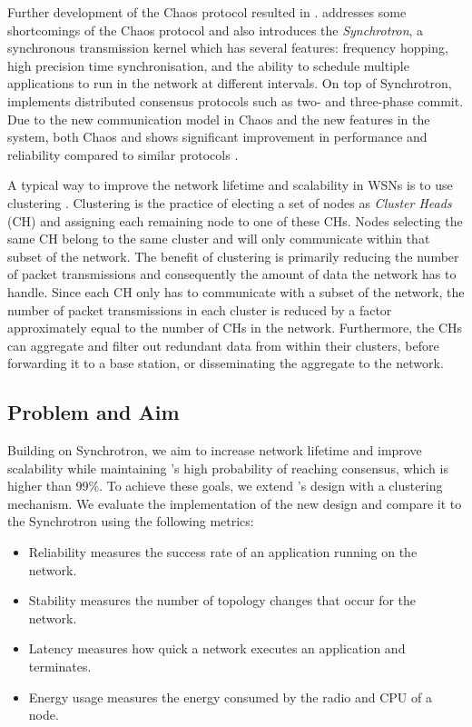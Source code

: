 Further development of the Chaos protocol resulted in \atwo{} \cite{a2-introduction-paper}. \atwo{} addresses some shortcomings of the Chaos protocol and also introduces the \atwo{} \textit{Synchrotron}, a synchronous transmission kernel which has several features: frequency hopping, high precision time synchronisation, and the ability to schedule multiple applications to run in the network at different intervals. On top of Synchrotron, \atwo{} implements distributed consensus protocols such as two- and three-phase commit. Due to the new communication model in Chaos and the new features in the \atwo{} system, both Chaos and \atwo{} shows significant improvement in performance and reliability compared to similar protocols \cite{chaos-introduction-paper, a2-introduction-paper}.

A typical way to improve the network lifetime and scalability in WSNs is to use clustering \cite{Afsar2014-clustering-survey, Younis2006-clustering-survey}. Clustering is the practice of electing a set of nodes as \emph{Cluster Heads} (CH) and assigning each remaining node to one of these CHs. Nodes selecting the same CH belong to the same cluster and will only communicate within that subset of the network. The benefit of clustering is primarily reducing the number of packet transmissions and consequently the amount of data the network has to handle. Since each CH only has to communicate with a subset of the network, the number of packet transmissions in each cluster is reduced by a factor approximately equal to the number of CHs in the network. Furthermore, the CHs can aggregate and filter out redundant data from within their clusters, before forwarding it to a base station, or disseminating the aggregate to the network.


\begin{newtext}{}
\section{Problem and Aim}
Building on \atwo{} Synchrotron, we aim to increase network lifetime and improve scalability while maintaining \atwo{}'s high probability of reaching consensus, which is higher than 99\%. To achieve these goals, we extend \atwo{}'s design with a clustering mechanism. We evaluate the implementation of the new design and compare it to the \atwo{} Synchrotron using the following metrics:

\begin{itemize}
    \item Reliability measures the success rate of an application running on the network.
    \item Stability measures the number of topology changes that occur for the network.
    \item Latency measures how quick a network executes an application and terminates.
    \item Energy usage measures the energy consumed by the radio and CPU of a node.
\end{itemize}

\end{newtext}

